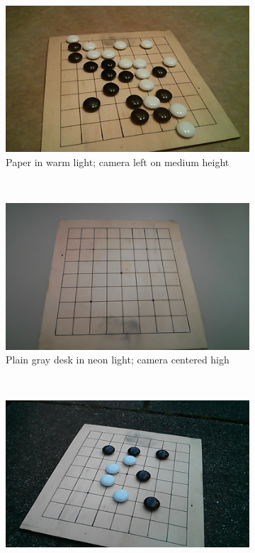 	\begin{figure}
		\begin{subfigure}[b]{0.3\textwidth}
			\includegraphics[width=\textwidth]{images/warmLight_many_leftMedium.png}
			\caption{Paper in warm light; camera left on medium height}
		\end{subfigure}
		~
		\begin{subfigure}[b]{0.3\textwidth}
				\includegraphics[width=\textwidth]{images/neonDesk_empty_centerAbove.png}
				\caption{Plain gray desk in neon light; camera centered high}
		\end{subfigure}
		~
		\begin{subfigure}[b]{0.3\textwidth}
				\includegraphics[width=\textwidth]{images/shadowStone_some_rightAbove.png}

\end{subfigure}
\end{figure}
